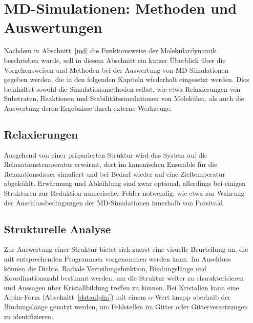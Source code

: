 \section{MD-Simulationen: Methoden und Auswertungen}
\label{mdmethods}


Nachdem in Abschnitt~\ref{md} die Funktionsweise der Molekulardynamik beschrieben wurde, soll in diesem Abschnitt ein kurzer Überblick über die Vorgehensweisen und Methoden bei der Auswertung von MD-Simulationen gegeben werden, die in den folgenden Kapiteln wiederholt eingesetzt werden.
Dies beinhaltet sowohl die Simulationsmethoden selbst, wie etwa Relaxierungen von Substraten, Reaktionen und Stabilitätssimulationen von Molekülen, als auch die Auswertung deren Ergebnisse durch externe Werkzeuge.

\subsection{Relaxierungen}


Ausgehend von einer präparierten Struktur wird das System auf die Relaxationstemperatur erwärmt, dort im kanonischen Ensemble für die Relaxationsdauer simuliert und bei Bedarf wieder auf eine Zieltemperatur abgekühlt.
Erwärmung und Abkühlung sind zwar optional, allerdings bei einigen Strukturen zur Reduktion numerischer Fehler notwendig, wie etwa zur Wahrung der Anschlussbedingungen der MD-Simulationen innerhalb von Parsivald.

\subsection{Strukturelle Analyse}

Zur Auswertung einer Struktur bietet sich zuerst eine visuelle Beurteilung an, die mit entsprechenden Programmen vorgenommen werden kann.
Im Anschluss können die Dichte, Radiale Verteilungsfunktion, Bindungslänge und Koordinationszahl bestimmt werden, um die Struktur weiter zu charakterisieren und Aussagen über Kristallbildung treffen zu können.
Bei Kristallen kann eine Alpha-Form (Abschnitt~\ref{dataalpha}) mit einem $\alpha$-Wert knapp oberhalb der Bindungslänge genutzt werden, um Fehlstellen im Gitter oder Gitterversetzungen zu identifizieren.

